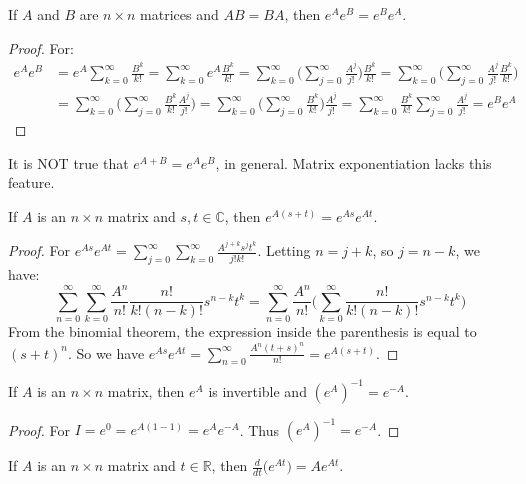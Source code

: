    \begin{theorem}
    If $A$ and $B$ are $n\times n$ matrices and $AB = BA$, then $e^{A}e^{B} = e^{B}e^{A}$.
    \end{theorem}
    \begin{proof}
    For:
    \begin{align*}
        e^A e^B &= e^A\sum_{k=0}^{\infty}\frac{B^k}{k!}=\sum_{k=0}^{\infty} e^A\frac{B^k}{k!}= \sum_{k=0}^{\infty} \big(\sum_{j=0}^{\infty} \frac{A^j}{j!}\big) \frac{B^k}{k!}= \sum_{k=0}^{\infty}\big(\sum_{j=0}^{\infty} \frac{A^j}{j!}\frac{B^k}{k!}\big)\\
        &=\sum_{k=0}^{\infty}\big(\sum_{j=0}^{\infty} \frac{B^k}{k!}\frac{A^j}{j!}\big)=\sum_{k=0}^{\infty}\big(\sum_{j=0}^{\infty} \frac{B^k}{k!}\big)\frac{A^j}{j!}= \sum_{k=0}^{\infty}\frac{B^k}{k!}\sum_{j=0}^{\infty}\frac{A^j}{j!}=e^{B}e^{A}
    \end{align*}
    \end{proof}
    It is NOT true that $e^{A+B}=e^{A}e^{B}$, in general. Matrix exponentiation lacks this feature.
    \begin{theorem}
    If $A$ is an $n\times n$ matrix and $s,t\in \mathbb{C}$, then $e^{A(s+t)} = e^{As}e^{At}$.
    \end{theorem}
    \begin{proof}
    For $e^{As}e^{At} = \sum_{j=0}^{\infty} \sum_{k=0}^{\infty} \frac{A^{j+k}s^jt^k}{j!k!}$. Letting $n = j+k$, so $j = n-k$, we have:
    \begin{equation*}
        \sum_{n=0}^{\infty} \sum_{k=0}^{\infty} \frac{A^n}{n!}\frac{n!}{k!(n-k)!}s^{n-k}t^k = \sum_{n=0}^{\infty}\frac{A^n}{n!}\big(\sum_{k=0}^{\infty} \frac{n!}{k!(n-k)!}s^{n-k}t^k\big)    
    \end{equation*}
    From the binomial theorem, the expression inside the parenthesis is equal to $(s+t)^n$. So we have $e^{As}e^{At}=\sum_{n=0}^{\infty} \frac{A^n(t+s)^n}{n!} = e^{A(s+t)}$.
    \end{proof}
    \begin{theorem}
    If $A$ is an $n\times n$ matrix, then $e^A$ is invertible and $(e^A)^{-1} = e^{-A}$.
    \end{theorem}
    \begin{proof}
    For $I = e^{0} = e^{A(1-1)} = e^Ae^{-A}$. Thus $(e^{A})^{-1} = e^{-A}$.
    \end{proof}
    \begin{theorem}
    If $A$ is an $n\times n$ matrix and $t\in \mathbb{R}$, then $\frac{d}{dt}\big(e^{At}\big) = Ae^{At}$.
    \end{theorem}
